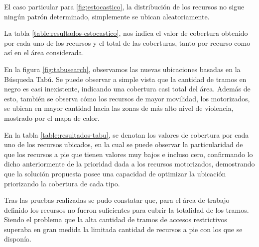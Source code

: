El caso particular para \ref{fig:estocastico}, la distribución de los recursos no sigue ningún patrón determinado, simplemente se ubican aleatoriamente.

La tabla \ref{table:resultados-estocastico}, nos indica el valor de cobertura obtenido por cada uno de los recursos y el total de las coberturas, tanto por recurso como así en el área considerada.

En la figura \ref{fig:tabusearch}, observamos las nuevas ubicaciones basadas en la Búsqueda Tabú. Se puede observar a simple vista que la cantidad de tramos en negro es casi inexistente, indicando una cobertura casi total del área. Además de esto, también se observa cómo los recursos de mayor movilidad, los motorizados, se ubican en mayor cantidad hacia las zonas de más alto nivel de violencia, mostrado por el mapa de calor.

En la tabla \ref{table:resultados-tabu}, se denotan los valores de cobertura por cada uno de los recursos ubicados, en la cual se puede observar la particularidad de que los recursos a pie que tienen valores muy bajos e incluso cero, confirmando lo dicho anteriormente de la prioridad dada a los recursos motorizados, demostrando que la solución propuesta posee una capacidad de optimizar la ubicación priorizando la cobertura de cada tipo.

Tras las pruebas realizadas se pudo constatar que, para el área de trabajo definido los recursos no fueron suficientes para cubrir la totalidad de los tramos. Siendo el problema que la alta cantidad de tramos de accesos restrictivos superaba en gran medida la limitada cantidad de recursos a pie con los que se disponía.

